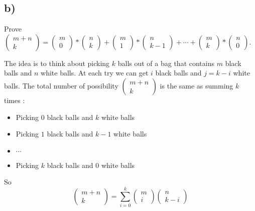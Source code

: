 \documentclass[a4paper,11pt]{report}
\begin{document}
\subsection*{b)}

Prove $\begin{pmatrix} m + n \\ k\end{pmatrix} = \begin{pmatrix} m \\
  0\end{pmatrix} * \begin{pmatrix} n \\ k\end{pmatrix} + \begin{pmatrix} m \\
  1\end{pmatrix} * \begin{pmatrix} n \\ k-1\end{pmatrix} + \cdots
+ \begin{pmatrix} m \\ k\end{pmatrix}* \begin{pmatrix} n \\ 0\end{pmatrix}$.

The idea is to think about picking $k$ balls out of a bag that contains $m$
black balls and $n$ white balls. At each try we can get $i$ black balls and $j =
k - i$ white balls. The total number of possibility $\begin{pmatrix} m+n \\
  k\end{pmatrix}$ is the same as summing $k$ times :
\begin{itemize}
\item Picking $0$ black balls and $k$ white balls
\item Picking $1$ black balls and $k-1$ white balls
\item $\cdots$
\item Picking $k$ black balls and $0$ white balls
\end{itemize}

So
$$
\begin{pmatrix} m + n \\ k\end{pmatrix} = \sum_{i=0}^{k}\begin{pmatrix} m \\
  i\end{pmatrix} \begin{pmatrix} n \\ k-i\end{pmatrix}
$$
\end{document}
